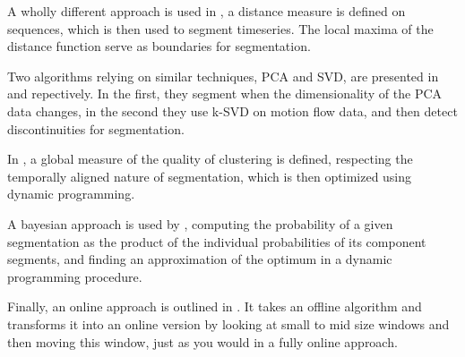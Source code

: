 A wholly different approach is used in \cite{StatisticalAnalysis}, a distance measure is defined on sequences, which is then used to segment timeseries. The local maxima of the distance function serve as boundaries for segmentation.

Two algorithms relying on similar techniques, PCA and SVD, are presented in \cite{Barbic:SegmentMotionCapture} and \cite{Spatiotemporal} repectively. In the first, they segment when the dimensionality of the PCA data changes, in the second they use k-SVD on motion flow data, and then detect discontinuities for segmentation.

In \cite{MotionImageSegmentation}, a global measure of the quality of clustering is defined, respecting the temporally aligned nature of segmentation, which is then optimized using dynamic programming.

A bayesian approach is used by \cite{hangingDependencyStructure}, computing the probability of a given segmentation as the product of the individual probabilities of its component segments, and finding an approximation of the optimum in a dynamic programming procedure.

Finally, an online approach is outlined in \cite{OnlineAlgorithmforSegmentation}. It takes an offline algorithm and transforms it into an online version by looking at small to mid size windows and then moving this window, just as you would in a fully online approach.



